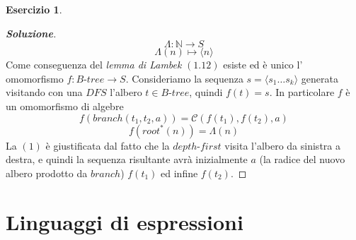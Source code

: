 \documentclass{article}
\theoremstyle{definition}
\newtheorem{esercizio}{Esercizio}
\theoremstyle{definition}
\theoremstyle{definition}
\theoremstyle{remark}
\begin{document}
\begin{esercizio}
\begin{proof}[\textbf{Soluzione}]
            $$\Lambda : \mathbb{N}\to S$$
            $$\Lambda(n)\mapsto \langle n\rangle$$
            Come conseguenza del \textit{lemma di Lambek} $(1.12)$ esiste  ed è unico l' omomorfismo $f:B\text{-}tree\to S$.
            Consideriamo la sequenza $s = \langle s_1\dots s_k\rangle$ generata visitando con una $DFS$ l'albero $t\in B\text{-}tree$,
            quindi $f(t) = s$. In particolare $f$ è un omomorfismo di algebre
            \begin{equation}
                f(branch(t_1,t_2,a)) = \mathcal{C}(f(t_1),f(t_2),a)
            \end{equation}
            \begin{equation}
                f(root^*(n)) = \Lambda(n)
            \end{equation}
            La $(1)$ è giustificata dal fatto che la  $depth$-$first$ visita l'albero  da  sinistra a destra, e quindi la sequenza
            risultante avrà inizialmente $a$ (la radice del nuovo albero prodotto da $branch$) $f(t_1)$  ed infine $f(t_2)$.
        \end{proof}
    \end{esercizio}

    \section{Linguaggi di espressioni}
\end{document}

